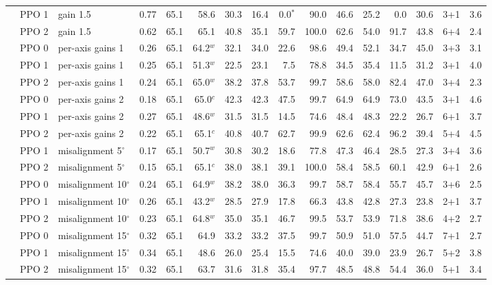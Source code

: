 \begin{tabular}{@{}lllrrrrrrrrrrrrr@{}}
 & PPO 1 & gain 1.5 & 0.77 & 65.1 & 58.6 & 30.3 & 16.4 & 0.0$^{*}$ & 90.0 & 46.6 & 25.2 & 0.0 & 30.6 & 3+1 & 3.6 \\
 & PPO 2 & gain 1.5 & 0.62 & 65.1 & 65.1 & 40.8 & 35.1 & 59.7 & 100.0 & 62.6 & 54.0 & 91.7 & 43.8 & 6+4 & 2.4 \\
 & PPO 0 & per-axis gains 1 & 0.26 & 65.1 & 64.2$^{w}$ & 32.1 & 34.0 & 22.6 & 98.6 & 49.4 & 52.1 & 34.7 & 45.0 & 3+3 & 3.1 \\
 & PPO 1 & per-axis gains 1 & 0.25 & 65.1 & 51.3$^{w}$ & 22.5 & 23.1 & 7.5 & 78.8 & 34.5 & 35.4 & 11.5 & 31.2 & 3+1 & 4.0 \\
 & PPO 2 & per-axis gains 1 & 0.24 & 65.1 & 65.0$^{w}$ & 38.2 & 37.8 & 53.7 & 99.7 & 58.6 & 58.0 & 82.4 & 47.0 & 3+4 & 2.3 \\
 & PPO 0 & per-axis gains 2 & 0.18 & 65.1 & 65.0$^{c}$ & 42.3 & 42.3 & 47.5 & 99.7 & 64.9 & 64.9 & 73.0 & 43.5 & 3+1 & 4.6 \\
 & PPO 1 & per-axis gains 2 & 0.27 & 65.1 & 48.6$^{w}$ & 31.5 & 31.5 & 14.5 & 74.6 & 48.4 & 48.3 & 22.2 & 26.7 & 6+1 & 3.7 \\
 & PPO 2 & per-axis gains 2 & 0.22 & 65.1 & 65.1$^{c}$ & 40.8 & 40.7 & 62.7 & 99.9 & 62.6 & 62.4 & 96.2 & 39.4 & 5+4 & 4.5 \\
 & PPO 1 & misalignment 5$^\circ$ & 0.17 & 65.1 & 50.7$^{w}$ & 30.8 & 30.2 & 18.6 & 77.8 & 47.3 & 46.4 & 28.5 & 27.3 & 3+4 & 3.6 \\
 & PPO 2 & misalignment 5$^\circ$ & 0.15 & 65.1 & 65.1$^{c}$ & 38.0 & 38.1 & 39.1 & 100.0 & 58.4 & 58.5 & 60.1 & 42.9 & 6+1 & 2.6 \\
 & PPO 0 & misalignment 10$^\circ$ & 0.24 & 65.1 & 64.9$^{w}$ & 38.2 & 38.0 & 36.3 & 99.7 & 58.7 & 58.4 & 55.7 & 45.7 & 3+6 & 2.5 \\
 & PPO 1 & misalignment 10$^\circ$ & 0.26 & 65.1 & 43.2$^{w}$ & 28.5 & 27.9 & 17.8 & 66.3 & 43.8 & 42.8 & 27.3 & 23.8 & 2+1 & 3.7 \\
 & PPO 2 & misalignment 10$^\circ$ & 0.23 & 65.1 & 64.8$^{w}$ & 35.0 & 35.1 & 46.7 & 99.5 & 53.7 & 53.9 & 71.8 & 38.6 & 4+2 & 2.7 \\
 & PPO 0 & misalignment 15$^\circ$ & 0.32 & 65.1 & 64.9 & 33.2 & 33.2 & 37.5 & 99.7 & 50.9 & 51.0 & 57.5 & 44.7 & 7+1 & 2.7 \\
 & PPO 1 & misalignment 15$^\circ$ & 0.34 & 65.1 & 48.6 & 26.0 & 25.4 & 15.5 & 74.6 & 40.0 & 39.0 & 23.9 & 26.7 & 5+2 & 3.8 \\
 & PPO 2 & misalignment 15$^\circ$ & 0.32 & 65.1 & 63.7 & 31.6 & 31.8 & 35.4 & 97.7 & 48.5 & 48.8 & 54.4 & 36.0 & 5+1 & 3.4 \\

\end{tabular}
